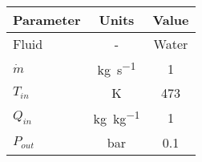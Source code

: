 \begin{tabular}{|p{2.5cm} c c|}
    \hline
    \rowcolor{bluepoli!40} %
    \textbf{Parameter} & \textbf{Units} & Value \T\B \\
    \hline \hline
    Fluid & - & Water \T\B\\
    \(\Dot{m}\)  & \unit{\kg\per\s} & \num{1} \T\B\\
    \(T_{in}\) & \unit{\K} & \num{473} \T\B\\
    \(Q_{in}\) & \unit{\kg\per\kg} & \num{1} \T\B\\
    \(P_{out}\) & \unit{\bar} & \num{0.1} \T\B\\
    \hline
\end{tabular}